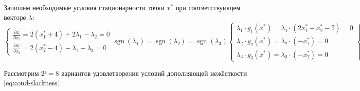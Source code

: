 \documentclass{article}
\renewcommand{\leq}{\leqslant}
\providecommand{\La}{\mathcal{L}}
\providecommand{\pardiff}[2]{\frac{\partial{#1}}{\partial{#2}}}
\DeclareMathOperator{\sgn}{sgn}
\theoremstyle{remark}
\theoremstyle{definition}
\numberwithin{equation}{section}
\begin{document}
Запишем необходимые условия стационарности точки $x^*$ при
соответствующем векторе $\lambda$:
\begin{subequations}
  \renewcommand{\theequation}{\theparentequation\asbuk{equation}}
  \label{eq:kkt-conditions}
  \begin{equation}
    \label{eq:cond-stationary}
    \begin{cases}
      \pardiff{\La}{x_1} = 2(x^*_1+4)+2\lambda_1-\lambda_2=0\\
      \pardiff{\La}{x_2} = 2(x^*_2-4)-\lambda_1-\lambda_3=0
    \end{cases}
  \end{equation}
  \begin{equation}
    \label{eq:cond-sign}
    \sgn(\lambda_1) = \sgn(\lambda_2) = \sgn(\lambda_3)
  \end{equation}
  \begin{equation}
    \label{eq:cond-slackness}
    \begin{cases}
      \lambda_1\cdot g_1(x^*) = \lambda_1\cdot (2x^*_1-x^*_2-2) = 0\\
      \lambda_2\cdot g_2(x^*) = \lambda_2\cdot (-x^*_1) = 0\\
      \lambda_3\cdot g_3(x^*) = \lambda_3\cdot (-x^*_2) = 0
    \end{cases}
  \end{equation}
  \begin{equation}
    \begin{cases}
      \label{eq:cond-feasible}
      g_1(x^*) = 2x^*_1 - x^*_2 - 2 \leq 0 \\
      g_2(x^*) = -x^*_1 \leq 0 \\
      g_3(x^*) = -x^*_2 \leq 0
    \end{cases}
  \end{equation}
\end{subequations}

Рассмотрим $2³=8$ вариантов удовлетворения условий дополняющей
нежёсткости \eqref{eq:cond-slackness}.
\end{document}
